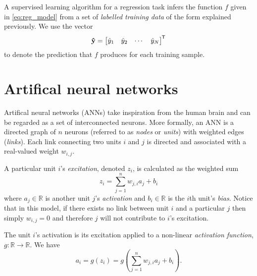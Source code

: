 \begin{definition}
    A supervised learning algorithm for a regression task infers the function $f$ given in \ref{eq:reg_model} from a set of \textit{labelled training data} of the form explained previously. 
    We use the vector
    \begin{equation}
        \label{eq:sup_learn_prediction}
        \mathbf{\hat{y}} = \begin{bmatrix}
            \hat{y}_1 & \hat{y}_2 & \cdots & \hat{y}_N
        \end{bmatrix}^{\mkern-1.5mu\mathsf{T}}
    \end{equation}
    to denote the prediction that $f$ produces for each training sample.
\end{definition}

\section{Artifical neural networks}
\label{sec:ann}
Artifical neural networks (ANNs) take inspiration from the human brain and can be regarded as a set of interconnected neurons. 
More formally, an ANN is a directed graph of $n$ neurons (referred to as \textit{nodes} or \textit{units}) with weighted edges (\textit{links}).
Each link connecting two units $i$ and $j$ is directed and associated with a real-valued weight $w_{i,j}$. 

A particular unit $i$'s \textit{excitation}, denoted $z_i$, is calculated as the weighted sum
\begin{equation}
    z_i = \sum_{j=1}^n{w_{j,i} a_j} + b_i
\end{equation}
where $a_j \in \mathbb{R}$ is another unit $j$'s \textit{activation} and $b_i \in \mathbb{R}$ is the $i$th unit's \textit{bias}.
Notice that in this model, if there exists no link between unit $i$ and a particular $j$ then simply $w_{i,j}=0$ and therefore $j$ will not contribute to $i$'s excitation. 

The unit $i$'s activation is its excitation applied to a non-linear \textit{activation function}, $g: \mathbb{R} \rightarrow \mathbb{R}$. We have
\begin{equation}
    \label{eq:ann_activation}
    a_i = g\left(z_i\right) = g\left(\sum_{j=1}^n{w_{j,i} a_j} + b_i\right).
\end{equation}

